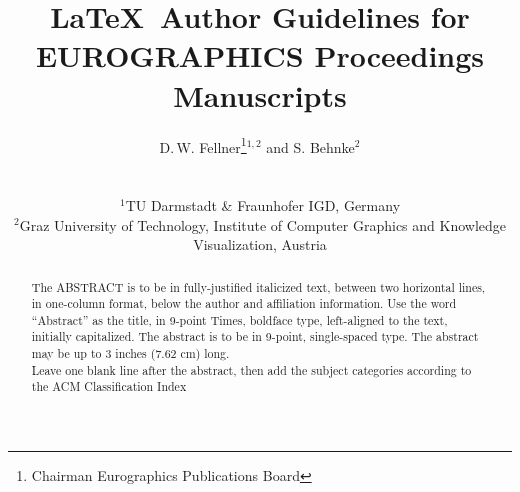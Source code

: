 

\title[EG \LaTeX\ Author Guidelines]%
      {\LaTeX\ Author Guidelines for EUROGRAPHICS Proceedings Manuscripts}

\author[D. Fellner \& S. Behnke]
{\parbox{\textwidth}{\centering D.\,W. Fellner\thanks{Chairman Eurographics Publications Board}$^{1,2}$
        and S. Behnke$^{2}$ 
        }
        \\
{\parbox{\textwidth}{\centering $^1$TU Darmstadt \& Fraunhofer IGD, Germany\\
         $^2$Graz University of Technology, Institute of Computer Graphics and Knowledge Visualization, Austria
       }
}
}



\maketitle
\begin{abstract}
   The ABSTRACT is to be in fully-justified italicized text, 
   between two horizontal lines,
   in one-column format, 
   below the author and affiliation information. 
   Use the word ``Abstract'' as the title, in 9-point Times, boldface type, 
   left-aligned to the text, initially capitalized. 
   The abstract is to be in 9-point, single-spaced type.
   The abstract may be up to 3 inches (7.62 cm) long. \\
   Leave one blank line after the abstract, 
   then add the subject categories according to the ACM Classification Index  
\end{abstract}  

